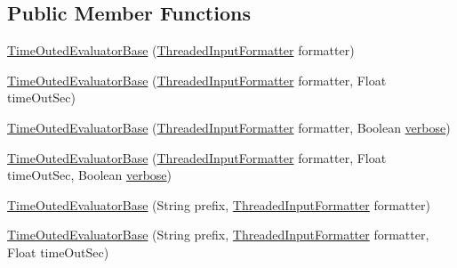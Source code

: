 \subsection*{Public Member Functions}
\begin{DoxyCompactItemize}
\item 
\hyperlink{classit_1_1emarolab_1_1cagg_1_1core_1_1evaluation_1_1interfacing_1_1TimeOutedEvaluatorBase_ab9f0b99580862b6f01b007632d638e98}{Time\-Outed\-Evaluator\-Base} (\hyperlink{classit_1_1emarolab_1_1cagg_1_1core_1_1evaluation_1_1inputFormatting_1_1ThreadedInputFormatter}{Threaded\-Input\-Formatter} formatter)
\item 
\hyperlink{classit_1_1emarolab_1_1cagg_1_1core_1_1evaluation_1_1interfacing_1_1TimeOutedEvaluatorBase_aebd3bc131edb53fbcdadc4024ec6abe7}{Time\-Outed\-Evaluator\-Base} (\hyperlink{classit_1_1emarolab_1_1cagg_1_1core_1_1evaluation_1_1inputFormatting_1_1ThreadedInputFormatter}{Threaded\-Input\-Formatter} formatter, Float time\-Out\-Sec)
\item 
\hyperlink{classit_1_1emarolab_1_1cagg_1_1core_1_1evaluation_1_1interfacing_1_1TimeOutedEvaluatorBase_a6961dc0c07e02a23543d3dbe192b304a}{Time\-Outed\-Evaluator\-Base} (\hyperlink{classit_1_1emarolab_1_1cagg_1_1core_1_1evaluation_1_1inputFormatting_1_1ThreadedInputFormatter}{Threaded\-Input\-Formatter} formatter, Boolean \hyperlink{classit_1_1emarolab_1_1cagg_1_1core_1_1evaluation_1_1interfacing_1_1TimeOutedEvaluatorBase_a9001a1905c1aa9ae0b1fbd95551150fc}{verbose})
\item 
\hyperlink{classit_1_1emarolab_1_1cagg_1_1core_1_1evaluation_1_1interfacing_1_1TimeOutedEvaluatorBase_a90fbb48e71141c433fa3ac29ea97325d}{Time\-Outed\-Evaluator\-Base} (\hyperlink{classit_1_1emarolab_1_1cagg_1_1core_1_1evaluation_1_1inputFormatting_1_1ThreadedInputFormatter}{Threaded\-Input\-Formatter} formatter, Float time\-Out\-Sec, Boolean \hyperlink{classit_1_1emarolab_1_1cagg_1_1core_1_1evaluation_1_1interfacing_1_1TimeOutedEvaluatorBase_a9001a1905c1aa9ae0b1fbd95551150fc}{verbose})
\item 
\hyperlink{classit_1_1emarolab_1_1cagg_1_1core_1_1evaluation_1_1interfacing_1_1TimeOutedEvaluatorBase_a1f7972da961077f6e759a53d4af31ef7}{Time\-Outed\-Evaluator\-Base} (String prefix, \hyperlink{classit_1_1emarolab_1_1cagg_1_1core_1_1evaluation_1_1inputFormatting_1_1ThreadedInputFormatter}{Threaded\-Input\-Formatter} formatter)
\item 
\hyperlink{classit_1_1emarolab_1_1cagg_1_1core_1_1evaluation_1_1interfacing_1_1TimeOutedEvaluatorBase_a962a83ecd08f406d3208f12e5c5b4bf8}{Time\-Outed\-Evaluator\-Base} (String prefix, \hyperlink{classit_1_1emarolab_1_1cagg_1_1core_1_1evaluation_1_1inputFormatting_1_1ThreadedInputFormatter}{Threaded\-Input\-Formatter} formatter, Float time\-Out\-Sec)

\end{DoxyCompactItemize}
